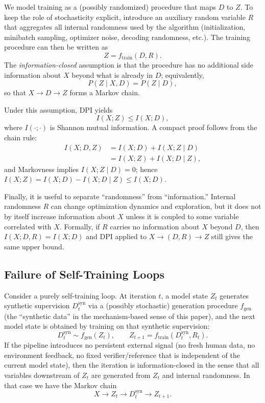 \documentclass{article}
\theoremstyle{plain}
\theoremstyle{definition}
\theoremstyle{remark}
\begin{document}
We model training as a (possibly randomized) procedure that maps $D$ to $Z$. To keep the role of stochasticity explicit, introduce an auxiliary random variable $R$ that aggregates all internal randomness used by the algorithm (initialization, minibatch sampling, optimizer noise, decoding randomness, etc.). The training procedure can then be written as
\[
Z  =  f_{\mathrm{train}}(D,R).
\]
The \textit{information-closed} assumption is that the procedure has no additional side information about $X$ beyond what is already in $D$; equivalently,
\[
P(Z \mid X,D)  =  P(Z \mid D),
\]
so that $X \to D \to Z$ forms a Markov chain.

Under this assumption, DPI yields
\[
I(X;Z) \le  I(X;D),
\]
where $I(\cdot;\cdot)$ is Shannon mutual information. A compact proof follows from the chain rule:
\begin{align*}
I(X;D,Z)&=I(X;D)+I(X;Z \mid D)\\
&=I(X;Z)+I(X;D \mid Z),
\end{align*}
and Markovness implies $I(X;Z \mid D)=0$; hence $I(X;Z)=I(X;D)-I(X;D \mid Z)\le I(X;D)$.

Finally, it is useful to separate ``randomness'' from ``information.'' Internal randomness $R$ can change optimization dynamics and exploration, but it does not by itself increase information about $X$ unless it is coupled to some variable correlated with $X$. Formally, if $R$ carries no information about $X$ beyond $D$, then $I(X;D,R)=I(X;D)$ and DPI applied to $X\to (D,R)\to Z$ still gives the same upper bound.

\subsection{Failure of Self-Training Loops}
\label{sec:closed-loop}

Consider a purely self-training loop. At iteration $t$, a model state $Z_t$ generates synthetic supervision $D^{\mathrm{syn}}_t$ via a (possibly stochastic) generation procedure $f_{\mathrm{gen}}$ (the ``synthetic data'' in the mechanism-based sense of this paper), and the next model state is obtained by training on that synthetic supervision:
\[
D^{\mathrm{syn}}_t \sim f_{\mathrm{gen}}(Z_t),\qquad
Z_{t+1}=f_{\mathrm{train}}(D^{\mathrm{syn}}_t,R_t).
\]
If the pipeline introduces no persistent external signal (no fresh human data, no environment feedback, no fixed verifier/reference that is independent of the current model state), then the iteration is information-closed in the sense that all variables downstream of $Z_t$ are generated from $Z_t$ and internal randomness. In that case we have the Markov chain
\[
X  \to  Z_t  \to  D^{\mathrm{syn}}_t  \to  Z_{t+1}.
\]
\end{document}
